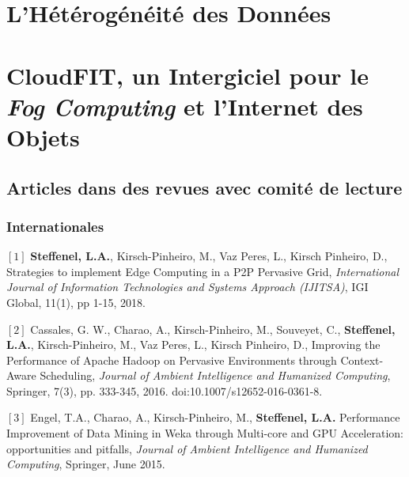 \documentclass[final,twoside]{hdr} %
\begin{document}


\chapter{L'Hétérogénéité des Données\label{chap:grappes}}




\chapter{CloudFIT, un Intergiciel pour le \textit{Fog Computing} et l'Internet des Objets\label{chap:CloudFIT}}








\section*{Articles dans des revues avec comité de lecture}

\subsection*{Internationales}

\noindent $[1]$
{\bf Steffenel, L.A.}, Kirsch-Pinheiro, M., Vaz Peres, L., Kirsch Pinheiro, D.,
{Strategies to implement Edge Computing in a P2P Pervasive Grid},
{\em International Journal of Information Technologies and Systems Approach (IJITSA)}, IGI Global, 11(1), pp 1-15, 2018.

\vspace{1em} \noindent $[2]$
Cassales, G. W., Charao, A., Kirsch-Pinheiro, M., Souveyet, C., {\bf Steffenel, L.A.}, Kirsch-Pinheiro, M., Vaz Peres, L., Kirsch Pinheiro, D.,
{Improving the Performance of Apache Hadoop on Pervasive Environments through Context-Aware Scheduling},
{\em  Journal of Ambient Intelligence and Humanized Computing}, Springer, 7(3), pp. 333-345, 2016. doi:10.1007/s12652-016-0361-8.

\vspace{1em} \noindent $[3]$
Engel, T.A., Charao, A., Kirsch-Pinheiro, M., {\bf Steffenel, L.A.} {Performance Improvement of Data Mining in Weka through Multi-core and GPU Acceleration: opportunities and pitfalls}, {\em Journal of Ambient Intelligence and Humanized Computing}, Springer, June 2015. 
\end{document}
